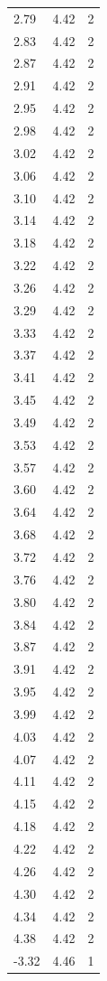\begin{longtable}{lrr}
  2.79 & 4.42 & 2 \\
  2.83 & 4.42 & 2 \\
  2.87 & 4.42 & 2 \\
  2.91 & 4.42 & 2 \\
  2.95 & 4.42 & 2 \\
  2.98 & 4.42 & 2 \\
  3.02 & 4.42 & 2 \\
  3.06 & 4.42 & 2 \\
  3.10 & 4.42 & 2 \\
  3.14 & 4.42 & 2 \\
  3.18 & 4.42 & 2 \\
  3.22 & 4.42 & 2 \\
  3.26 & 4.42 & 2 \\
  3.29 & 4.42 & 2 \\
  3.33 & 4.42 & 2 \\
  3.37 & 4.42 & 2 \\
  3.41 & 4.42 & 2 \\
  3.45 & 4.42 & 2 \\
  3.49 & 4.42 & 2 \\
  3.53 & 4.42 & 2 \\
  3.57 & 4.42 & 2 \\
  3.60 & 4.42 & 2 \\
  3.64 & 4.42 & 2 \\
  3.68 & 4.42 & 2 \\
  3.72 & 4.42 & 2 \\
  3.76 & 4.42 & 2 \\
  3.80 & 4.42 & 2 \\
  3.84 & 4.42 & 2 \\
  3.87 & 4.42 & 2 \\
  3.91 & 4.42 & 2 \\
  3.95 & 4.42 & 2 \\
  3.99 & 4.42 & 2 \\
  4.03 & 4.42 & 2 \\
  4.07 & 4.42 & 2 \\
  4.11 & 4.42 & 2 \\
  4.15 & 4.42 & 2 \\
  4.18 & 4.42 & 2 \\
  4.22 & 4.42 & 2 \\
  4.26 & 4.42 & 2 \\
  4.30 & 4.42 & 2 \\
  4.34 & 4.42 & 2 \\
  4.38 & 4.42 & 2 \\
  -3.32 & 4.46 & 1 \\

\end{longtable}
